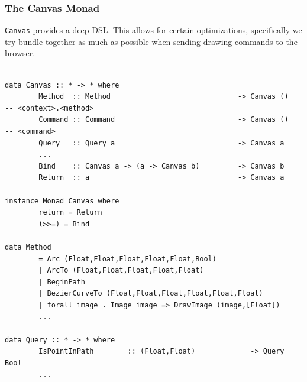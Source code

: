 \documentclass{beamer}
\begin{document}
\begin{frame}[fragile]
\frametitle{The Canvas Monad}

{\tt Canvas} provides a deep DSL. This allows for certain optimizations,
specifically we try bundle together as much as possible when
sending drawing commands to the browser.

\begin{codeblock}[0.9]
\tiny
\begin{verbatim}

data Canvas :: * -> * where
        Method  :: Method                              -> Canvas ()     -- <context>.<method>
        Command :: Command                             -> Canvas ()     -- <command>
        Query   :: Query a                             -> Canvas a
        ...
        Bind    :: Canvas a -> (a -> Canvas b)         -> Canvas b
        Return  :: a                                   -> Canvas a

instance Monad Canvas where
        return = Return
        (>>=) = Bind

data Method
        = Arc (Float,Float,Float,Float,Float,Bool)
        | ArcTo (Float,Float,Float,Float,Float)
        | BeginPath
        | BezierCurveTo (Float,Float,Float,Float,Float,Float)
        | forall image . Image image => DrawImage (image,[Float])
        ...

data Query :: * -> * where
        IsPointInPath        :: (Float,Float)             -> Query Bool
        ...
\end{verbatim}

\end{codeblock}

\end{frame}
\end{document}
